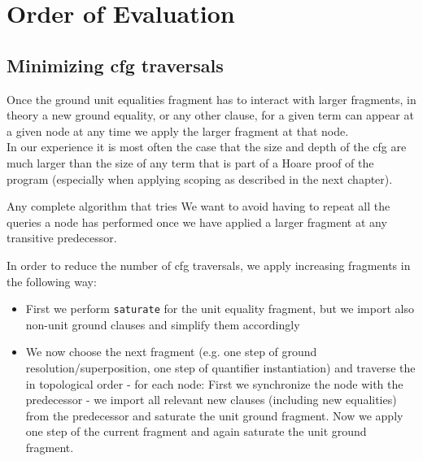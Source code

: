 \section{Order of Evaluation}
\subsection{Minimizing cfg traversals}
Once the ground unit equalities fragment has to interact with larger fragments, in theory a new ground equality, or any other clause, for a given term can appear at a given node at any time we apply the larger fragment at that node.\\
In our experience it is most often the case that the size and depth of the cfg are much larger than the size of any term that is part of a Hoare proof of the program (especially when applying scoping as described in the next chapter).

Any complete algorithm that tries 
We want to avoid having to repeat all the queries a node has performed once we have applied a larger fragment at any transitive predecessor.

In order to reduce the number of cfg traversals, we apply increasing fragments in the following way:
\begin{itemize}
	\item First we perform \lstinline{saturate} for the unit equality fragment, but we import also non-unit ground clauses and simplify them accordingly
	\item We now choose the next fragment (e.g. one step of ground resolution/superposition, one step of quantifier instantiation) and traverse the \cfg in topological order - for each node:
		\subitem First we synchronize the node with the predecessor - we import all relevant new clauses (including new equalities) from the predecessor and saturate the unit ground fragment. 		
		\subitem Now we apply one step of the current fragment and again saturate the unit ground fragment.
\end{itemize}


